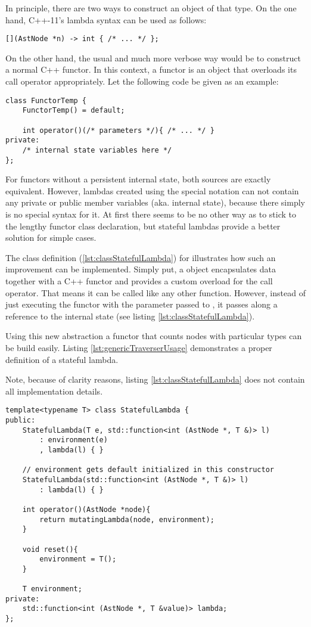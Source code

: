 In principle, there are two ways to construct an object of that
type. On the one hand, C++-11's lambda syntax can be used as follows:
\begin{lstlisting}[style=c++]
[](AstNode *n) -> int { /* ... */ };
\end{lstlisting}
On the other hand, the usual and much more verbose way would be to
construct a normal C++ functor. In this context, a functor is an object
that overloads its call operator appropriately. Let the following
code be given as an example:
%
\begin{lstlisting}[style=c++]
class FunctorTemp {
    FunctorTemp() = default;

    int operator()(/* parameters */){ /* ... */ }
private:
    /* internal state variables here */
};
\end{lstlisting}
%
For functors without a persistent internal state, both sources are
exactly equivalent. However, lambdas created using the special notation
can not contain any private or
public member variables (aka. internal state), because there simply is
no special syntax for it. At first there seems to be no other way as to
stick to the lengthy functor class declaration, but stateful lambdas
provide a better solution for simple cases.

The class definition (\ref{lst:classStatefulLambda}) for
 illustrates how such an
improvement can be implemented.
Simply put, a  object encapsulates data together
with a C++ functor and provides a custom overload for the call
operator. That means it can be called like any other
function. However, instead of just executing the functor with the
parameter passed to , it passes along a reference to
the internal state  (see listing
\ref{lst:classStatefulLambda}).

Using this new abstraction a functor that counts nodes with particular
types can be build easily. Listing \ref{lst:genericTraverserUsage}
demonstrates a proper definition of a stateful lambda.

Note, because of clarity reasons, listing
\ref{lst:classStatefulLambda} does not contain all implementation
details.
%
\begin{lstlisting}[style=c++,caption={An interface for stateful
      lambdas},label={lst:classStatefulLambda}]
template<typename T> class StatefulLambda {
public:
    StatefulLambda(T e, std::function<int (AstNode *, T &)> l)
        : environment(e)
        , lambda(l) { }

    // environment gets default initialized in this constructor
    StatefulLambda(std::function<int (AstNode *, T &)> l)
        : lambda(l) { }

    int operator()(AstNode *node){
        return mutatingLambda(node, environment);
    }

    void reset(){
        environment = T();
    }

    T environment;
private:
    std::function<int (AstNode *, T &value)> lambda;
};
\end{lstlisting}
